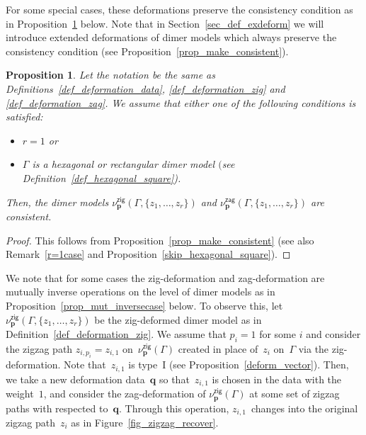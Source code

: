 \documentclass[pdftex]{sigma}%
\numberwithin{equation}{section}
\numberwithin{figure}{section}
\numberwithin{table}{section}
\newtheorem{Proposition}[Theorem]{Proposition}
 { \theoremstyle{definition}
\newtheorem{Definition}[Theorem]{Definition}
\newtheorem{Note}[Theorem]{Note}
\newtheorem{Example}[Theorem]{Example}
\newtheorem{Remark}[Theorem]{Remark}
\newtheorem{observation}[Theorem]{Observation}
\newtheorem{operation}[Theorem]{Operation}
\newtheorem{setting}[Theorem]{Setting}}
\newcommand{\bfp}{\mathbf{p}}
\newcommand{\bfq}{\mathbf{q}}
\newcommand{\zig}{\mathsf{zig}}
\newcommand{\zag}{\mathsf{zag}}
\begin{document}
For some special cases, these deformations preserve the consistency condition as in Proposition~\ref{prop_preserve_consistent1} below. Note that in Section~\ref{sec_def_exdeform} we will introduce extended deformations of dimer models which always preserve the consistency condition (see Proposition~\ref{prop_make_consistent}).

\begin{Proposition}\label{prop_preserve_consistent1}
Let the notation be the same as Definitions~{\rm \ref{def_deformation_data}}, {\rm \ref{def_deformation_zig}} and {\rm \ref{def_deformation_zag}}.
We assume that either one of the following conditions is satisfied:
\begin{itemize}\itemsep=0pt
\item[$(i)$] $r=1$ or
\item[$(ii)$] $\Gamma$ is a hexagonal or rectangular dimer model $($see Definition~{\rm \ref{def_hexagonal_square})}.
\end{itemize}
Then, the dimer models $\nu^\zig_\bfp(\Gamma, \{z_1,\dots,z_r\})$ and $\nu^\zag_\bfp(\Gamma, \{z_1,\dots,z_r\})$ are consistent.
\end{Proposition}

\begin{proof}This follows from Proposition~\ref{prop_make_consistent} (see also Remark~\ref{r=1case} and Proposition~\ref{skip_hexagonal_square}).
\end{proof}

We note that for some cases the zig-deformation and zag-deformation are mutually inverse operations
on the level of dimer models as in Proposition~\ref{prop_mut_inversecase} below.
To observe this, let $\nu^\zig_\bfp(\Gamma, \{z_1,\dots,z_r\})$ be the zig-deformed dimer model as in Definition~\ref{def_deformation_zig}.
We assume that $p_i=1$ for some $i$ and consider the zigzag path $z_{i,p_i}=z_{i,1}$ on~$\nu^\zig_\bfp(\Gamma)$ created in place of~$z_i$ on~$\Gamma$ via the zig-deformation. Note that~$z_{i,1}$ is type~I (see Proposition~\ref{deform_vector}).
Then, we take a new deformation data~$\bfq$ so that~$z_{i,1}$ is chosen in the data with the weight~$1$,
and consider the zag-deformation of $\nu^\zig_\bfp(\Gamma)$ at some set of zigzag paths with respected to~$\bfq$.
Through this operation, $z_{i,1}$~changes into the original zigzag path~$z_i$ as in Figure~\ref{fig_zigzag_recover}.
\end{document}

